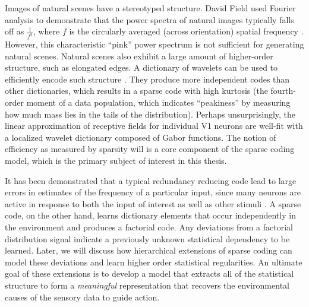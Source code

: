 Images of natural scenes have a stereotyped structure. David Field used Fourier analysis to demonstrate that the power spectra of natural images typically falls off as $\tfrac{1}{f^{2}}$, where $f$ is the circularly averaged (across orientation) spatial frequency \parencite{field1987relations}. However, this characteristic ``pink'' power spectrum is not sufficient for generating natural scenes. Natural scenes also exhibit a large amount of higher-order structure, such as elongated edges. A dictionary of wavelets can be used to efficiently encode such structure \parencite{field1999wavelets}. They produce more independent codes than other dictionaries, which results in a sparse code with high kurtosis (the fourth-order moment of a data population, which indicates ``peakiness'' by measuring how much mass lies in the tails of the distribution). Perhaps unsurprisingly, the linear approximation of receptive fields for individual V1 neurons are well-fit with a localized wavelet dictionary composed of Gabor functions. The notion of efficiency as measured by sparsity will is a core component of the sparse coding model, which is the primary subject of interest in this thesis.

It has been demonstrated that a typical redundancy reducing code lead to large errors in estimates of the frequency of a particular input, since many neurons are active in response to both the input of interest as well as other stimuli \parencite{gardnermedwin2001limits}. A sparse code, on the other hand, learns dictionary elements that occur independently in the environment and produces a factorial code. Any deviations from a factorial distribution signal indicate a previously unknown statistical dependency to be learned. Later, we will discuss how hierarchical extensions of sparse coding can model these deviations and learn higher order statistical regularities. An ultimate goal of these extensions is to develop a model that extracts all of the statistical structure to form a \textit{meaningful} representation that recovers the environmental causes of the sensory data to guide action.
 


